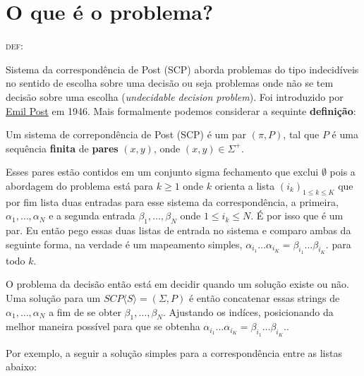 \documentclass[12pt, a4paper]{article}
\begin{document}


\tableofcontents
\pagebreak

\listoffigures
\pagebreak

\pagebreak
\section{O que é o problema?}

\begin{center}
\begin{huge}\textsc{def}:\end{huge}
\end{center}


\qquad Sistema da correspondência de Post (SCP) aborda problemas do  tipo indecidíveis no sentido de escolha sobre uma decisão ou seja problemas onde não se tem decisão sobre uma escolha (\textit{undecidable decision problem}). Foi introduzido por \href{http://en.wikipedia.org/wiki/Emil_Post}{Emil Post} em 1946. Mais formalmente podemos considerar a sequinte \textbf{definição}:

\qquad Um sistema de correpondência de Post (SCP) é um par $(\pi, P)$, tal que $P$ é uma sequência \textbf{finita} de \textbf{pares} $(x,y)$, onde $(x,y) \in \Sigma^{+}$.

\qquad Esses pares estão contidos em um conjunto sigma fechamento que exclui $\emptyset$ pois a abordagem do problema está para $k \ge 1$ onde $k$ orienta a lista $(i_k)_{1 \le k \le K}$ que por fim lista duas entradas para esse sistema da correspondência, a primeira, $\alpha_{1}, \ldots, \alpha_{N}$ e a segunda entrada $\beta_{1}, \ldots, \beta_{N}$ onde $ 1 \le i_k \le N$. É por isso que é um par. Eu então pego essas duas listas de entrada no sistema e comparo ambas da seguinte forma, na verdade é um mapeamento simples,  $\alpha_{i_1} \ldots \alpha_{i_K} = \beta_{i_1} \ldots \beta_{i_K}.$ para todo $k$.

\qquad O problema da decisão então está em decidir quando um solução existe ou não. Uma solução para um $SCP \langle S \rangle = (\Sigma, P)$ é então concatenar essas strings de $\alpha_{1}, \ldots, \alpha_{N}$ a fim de se obter $\beta_{1}, \ldots, \beta_{N}$. Ajustando os indíces, posicionando da melhor maneira possível para que se obtenha $\alpha_{i_1} \ldots \alpha_{i_K} = \beta_{i_1} \ldots \beta_{i_K}.$.

\qquad Por exemplo, a seguir a solução simples para a correspondência entre as listas abaixo:
\end{document}
